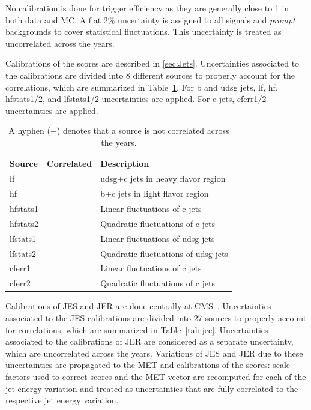 No calibration is done for trigger efficiency as they are generally close to 1 in both data and \ac{MC}. A flat 2$\%$ uncertainty is assigned to all signals and \emph{prompt} backgrounds to cover statistical fluctuations. This uncertainty is treated as uncorrelated across the years.

Calibrations of the \DeepJ scores are described in \autoref{sec:Jets}. Uncertainties associated to the calibrations are divided into 8 different sources to properly account for the correlations, which are summarized in Table~\ref{tab:btagsys}. For b and udsg jets, lf, hf, hfstats1/2, and lfstats1/2 uncertainties are applied. For c jets, cferr1/2 uncertainties are applied. 

\begin{table}[!hbtp]
\sffamily
\centering
\caption{
A hyphen ($-$) denotes that a source is not correlated across the years.
}
\begin{tabular}{lcl}
\toprule
Source & Correlated & Description\\
\midrule
lf			& \checkmark & udsg+c jets in heavy flavor region\\ %
hf			& \checkmark & b+c jets in light flavor region \\ %
hfstats1	& - 		 & Linear fluctuations of c jets\\
hfstats2	& -			 & Quadratic fluctuations of c jets \\
lfstats1	& -			 & Linear fluctuations of udsg jets \\
lfstats2	& -			 & Quadratic fluctuations of udsg jets \\
cferr1		& \checkmark & Linear fluctuations of c jets \\
cferr2		& \checkmark & Quadratic fluctuations of c jets \\
\bottomrule
\end{tabular}
\label{tab:btagsys}
\end{table}

Calibrations of \ac{JES} and \ac{JER} are done centrally at \ac{CMS}~\cite{CMS:2016lmd}. Uncertainties associated to the \ac{JES} calibrations are divided into 27 sources to properly account for correlations, which are summarized in Table~\ref{tab:jec}. Uncertainties associated to the calibrations of \ac{JER} are considered as a separate uncertainty, which are uncorrelated across the years. Variations of \ac{JES} and \ac{JER} due to these uncertainties are propagated to the \ac{MET} and calibrations of the \DeepJ scores: scale factors used to correct \DeepJ scores and the \ac{MET} vector are recomputed for each of the jet energy variation and treated as uncertainties that are fully correlated to the respective jet energy variation. 

